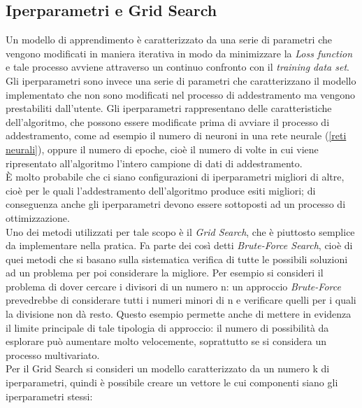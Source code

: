 \newpage


\subsection{Iperparametri e Grid Search}
\label{iperparametri e grid search}

Un modello di apprendimento è caratterizzato da una serie di parametri che vengono modificati in maniera iterativa in modo da minimizzare la \textit{Loss function} e tale processo avviene attraverso un continuo confronto con il \textit{training data set}.\\ 
Gli iperparametri sono invece una serie di parametri che caratterizzano il modello implementato che non sono modificati nel processo di addestramento ma vengono prestabiliti dall'utente. Gli iperparametri rappresentano delle caratteristiche dell'algoritmo, che possono essere modificate prima di avviare il processo di addestramento, come ad esempio il numero di neuroni in una rete neurale (\ref{reti neurali}), oppure il numero di epoche, cioè il numero di volte in cui viene ripresentato all'algoritmo l'intero campione di dati di addestramento.\\
È molto probabile che ci siano configurazioni di iperparametri migliori di altre, cioè per le quali l'addestramento dell'algoritmo produce esiti migliori; di conseguenza anche gli iperparametri devono essere sottoposti ad un processo di ottimizzazione. \\
Uno dei metodi utilizzati per tale scopo è il \textit{Grid Search}, che è piuttosto semplice da implementare nella pratica. Fa parte dei così detti \textit{Brute-Force Search}, cioè di quei metodi che si basano sulla sistematica verifica di tutte le possibili soluzioni ad un problema per poi considerare la migliore. Per esempio si consideri il problema di dover cercare i divisori di un numero n: un approccio \textit{Brute-Force} prevedrebbe di considerare tutti i numeri minori di n e verificare quelli per i quali la divisione non dà resto. Questo esempio permette anche di mettere in evidenza il limite principale di tale tipologia di approccio: il numero di possibilità da esplorare può aumentare molto velocemente, soprattutto se si considera un processo multivariato. \\
Per il Grid Search si consideri un modello caratterizzato da un numero k di iperparametri, quindi è possibile creare un vettore le cui componenti siano gli iperparametri stessi:
